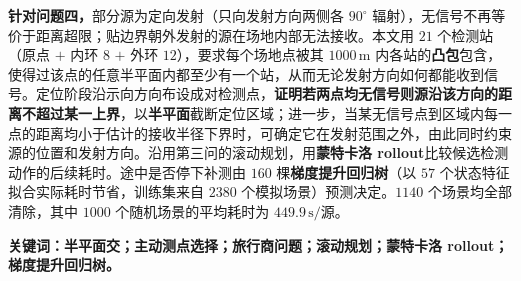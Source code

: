 \textbf{针对问题四，}部分源为定向发射（只向发射方向两侧各 $90^\circ$ 辐射），无信号不再等价于距离超限；贴边界朝外发射的源在场地内部无法接收。本文用 $21$ 个检测站（原点 $+$ 内环 $8$ $+$ 外环 $12$），要求每个场地点被其 $1000\,\mathrm{m}$ 内各站的\textbf{凸包}包含，使得过该点的任意半平面内都至少有一个站，从而无论发射方向如何都能收到信号。定位阶段沿示向方向布设成对检测点，\textbf{证明若两点均无信号则源沿该方向的距离不超过某一上界}，以\textbf{半平面}截断定位区域；进一步，当某无信号点到区域内每一点的距离均小于估计的接收半径下界时，可确定它在发射范围之外，由此同时约束源的位置和发射方向。沿用第三问的滚动规划，用\textbf{蒙特卡洛 rollout}比较候选检测动作的后续耗时。途中是否停下补测由 $160$ 棵\textbf{梯度提升回归树}（以 $57$ 个状态特征拟合实际耗时节省，训练集来自 $2380$ 个模拟场景）预测决定。$1140$ 个场景均全部清除，其中 $1000$ 个随机场景的平均耗时为 $449.9\,\mathrm{s}/\text{源}$。

\vspace{12pt}
\noindent\textbf{关键词：半平面交；主动测点选择；旅行商问题；滚动规划；蒙特卡洛 rollout；梯度提升回归树。}
